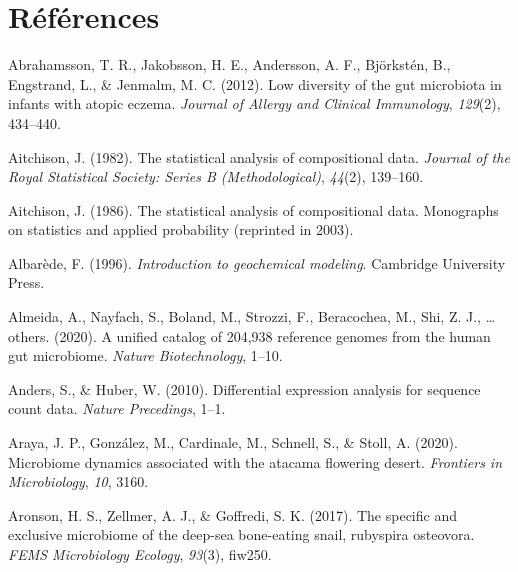 \documentclass[12pt,a4paper]{reedthesis}
\theoremstyle{definition}
\theoremstyle{definition}
\theoremstyle{definition}
\theoremstyle{remark}
\begin{document}
\hypertarget{ruxe9fuxe9rences}{%
\chapter*{Références}\label{ruxe9fuxe9rences}}


\noindent

\setlength{\parindent}{-0.20in}
\setlength{\leftskip}{0.20in}
\setlength{\parskip}{8pt}

\hypertarget{refs}{}
\leavevmode\hypertarget{ref-abrahamsson2012low}{}%
Abrahamsson, T. R., Jakobsson, H. E., Andersson, A. F., Björkstén, B., Engstrand, L., \& Jenmalm, M. C. (2012). Low diversity of the gut microbiota in infants with atopic eczema. \emph{Journal of Allergy and Clinical Immunology}, \emph{129}(2), 434--440.

\leavevmode\hypertarget{ref-aitchison1982statistical}{}%
Aitchison, J. (1982). The statistical analysis of compositional data. \emph{Journal of the Royal Statistical Society: Series B (Methodological)}, \emph{44}(2), 139--160.

\leavevmode\hypertarget{ref-aitchison1986statistical}{}%
Aitchison, J. (1986). The statistical analysis of compositional data. Monographs on statistics and applied probability (reprinted in 2003).

\leavevmode\hypertarget{ref-albarede1996introduction}{}%
Albarède, F. (1996). \emph{Introduction to geochemical modeling}. Cambridge University Press.

\leavevmode\hypertarget{ref-almeida2020unified}{}%
Almeida, A., Nayfach, S., Boland, M., Strozzi, F., Beracochea, M., Shi, Z. J., \ldots{} others. (2020). A unified catalog of 204,938 reference genomes from the human gut microbiome. \emph{Nature Biotechnology}, 1--10.

\leavevmode\hypertarget{ref-anders2010differential}{}%
Anders, S., \& Huber, W. (2010). Differential expression analysis for sequence count data. \emph{Nature Precedings}, 1--1.

\leavevmode\hypertarget{ref-araya2020microbiome}{}%
Araya, J. P., González, M., Cardinale, M., Schnell, S., \& Stoll, A. (2020). Microbiome dynamics associated with the atacama flowering desert. \emph{Frontiers in Microbiology}, \emph{10}, 3160.

\leavevmode\hypertarget{ref-aronson2017specific}{}%
Aronson, H. S., Zellmer, A. J., \& Goffredi, S. K. (2017). The specific and exclusive microbiome of the deep-sea bone-eating snail, rubyspira osteovora. \emph{FEMS Microbiology Ecology}, \emph{93}(3), fiw250.
\end{document}
